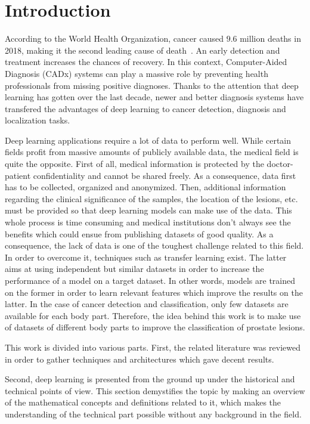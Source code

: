 
\chapter{Introduction}
\label{ch:introduction}

According to the World Health Organization, cancer caused $9.6$ million deaths in 2018, making it the second leading cause of death~\cite{44}. An early detection and treatment increases the chances of recovery. In this context, Computer-Aided Diagnosis (CADx) systems can play a massive role by preventing health professionals from missing positive diagnoses. Thanks to the attention that deep learning has gotten over the last decade, newer and better diagnosis systems have transfered the advantages of deep learning to cancer detection, diagnosis and localization tasks.

Deep learning applications require a lot of data to perform well. While certain fields profit from massive amounts of publicly available data, the medical field is quite the opposite. First of all, medical information is protected by the doctor-patient confidentiality and cannot be shared freely. As a consequence, data first has to be collected, organized and anonymized. Then, additional information regarding the clinical significance of the samples, the location of the lesions, etc. must be provided so that deep learning models can make use of the data. This whole process is time consuming and medical institutions don't always see the benefits which could ensue from publishing datasets of good quality. As a consequence, the lack of data is one of the toughest challenge related to this field. In order to overcome it, techniques such as transfer learning exist. The latter aims at using independent but similar datasets in order to increase the performance of a model on a target dataset. In other words, models are trained on the former in order to learn relevant features which improve the results on the latter. In the case of cancer detection and classification, only few datasets are available for each body part. Therefore, the idea behind this work is to make use of datasets of different body parts to improve the classification of prostate lesions.

This work is divided into various parts. First, the related literature was reviewed in order to gather techniques and architectures which gave decent results.

Second, deep learning is presented from the ground up under the historical and technical points of view. This section demystifies the topic by making an overview of the mathematical concepts and definitions related to it, which makes the understanding of the technical part possible without any background in the field.

